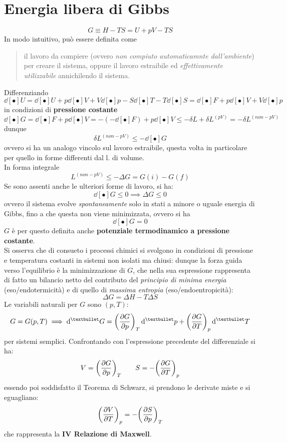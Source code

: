 \documentclass[10pt, oneside]{book}
\begin{document}
\section{Energia libera di Gibbs}
\[G \equiv H - TS = U + pV - TS\]
In modo intuitivo, può essere definita come
\begin{quote}
il lavoro da compiere (ovvero \textit{non compiuto automaticamnte dall'ambiente}) per creare il sistema, oppure il lavoro estraibile ed \textit{effettivamente utilizzabile} annichilendo il sistema.
\end{quote}
Differenziando
\[\dd[•]{U} = \dd[•]{U} + p \dd[•]{V} + V \dd[•]{p} - S\dd[•]{T} - T \dd[•]{S} = \dd[•]{F} + p\dd[•]{V} + V \dd[•]{p}\]
in condizioni di \textbf{pressione costante} 
\[\dd[•]{G} = \dd[•]{F} + p \dd[•]{V} = - (-\dd[•]{F}) + p \dd[•]{V} \leq - \delta L + \delta L^{(pV)} = - \delta L^{(non-pV)}\]
dunque
\[\delta L^{(non-pV)} \leq - \dd[•]{G}  \]
ovvero si ha un analogo vincolo sul lavoro estraibile, questa volta in particolare per quello in forme differenti dal l. di volume.\\
In forma integrale
\[L^{(non-pV)} \leq - \Delta G = G(i) - G(f)\]
Se sono assenti anche le ulteriori forme di lavoro, si ha:
\[\dd[•]{G} \leq 0 \implies \Delta G \leq 0\]
ovvero il sistema evolve \textit{spontaneamente} solo in stati a minore o uguale energia di Gibbs, fino a che questa non viene minimizzata, ovvero si ha
\[\dd[•]{G} = 0\]
$G$ è per questo definita anche \textbf{potenziale termodinamico a pressione costante}.\\
Si osserva che di consueto i processi chimici si svolgono in condizioni di pressione e temperatura costanti in sistemi non isolati ma chiusi: dunque la forza guida verso l'equilibrio è la minimizzazione di $G$, che nella sua espressione rappresenta di fatto un bilancio netto del contributo del \textit{principio di minima energia} (eso/endotermicità) e di quello di \textit{massima entropia} (eso/endoentropicità):
\[\Delta G = \Delta H - T \Delta S\]
Le variabili naturali per $G$ sono $(p,T)$:
\[G = G(p,T) \implies \dd[•]{G} =  \bigg(\pdv{G}{p}\bigg)_T \dd[•]{p} + \bigg(\pdv{G}{T}\bigg)_p \dd[•]{T}\]
per sistemi semplici. Confrontando con l'espressione precedente del differenziale si ha:
\[V = \bigg(\pdv{G}{p}\bigg)_T \qquad S = - \bigg(\pdv{G}{T}\bigg)_p\]
essendo poi soddisfatto il Teorema di Schwarz, si prendono le derivate miste e si eguagliano:
\[\bigg(\pdv{V}{T}\bigg)_p = - \bigg(\pdv{S}{p}\bigg)_T\]
che rappresenta la \textbf{IV Relazione di Maxwell}.
\end{document}
